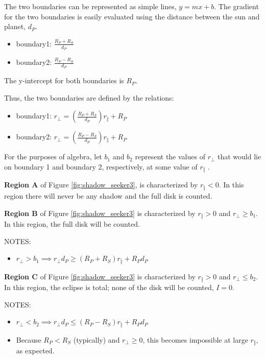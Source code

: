    The two boundaries can be represented as simple lines, $y=mx+b$.
   The gradient for the two boundaries is easily evaluated using the
   distance between the sun and planet, $d_P$.
   \begin{itemize}
    \item boundary1: $\frac{R_P+R_S} {d_P}$
    \item boundary2: $\frac{R_P-R_S} {d_P}$
   \end{itemize}
   The y-intercept for both boundaries is $R_P$.

   Thus, the two boundaries are defined by the relations:
   \begin{itemize}
    \item boundary1: $r_\bot=\left(\frac{R_{P}+R_{S}}{d_{P}}\right)r_\Vert+R_{P}$
    \item boundary2: $r_\bot=\left(\frac{R_{P}-R_{S}}{d_{P}}\right)r_\Vert+R_{P}$
   \end{itemize}


   For the purposes of algebra, let  $b_{1}$  and
    $b_{2}$ represent the values of
   $r_\bot$ that would lie on boundary 1 and boundary
   2, respectively, at some value of  $r_\Vert$ .

   \textbf{Region A} of Figure \ref{fig:shadow_seeker3}, is characterized by
   $r_\Vert<0$.  In this region there will never be any shadow and the full
   disk is counted.


   \textbf{Region B} of Figure \ref{fig:shadow_seeker3} is characterized by
    $r_\Vert>0$ and $r_\bot \geqslant b_{1}$.  In this region, the full disk
    will be counted.

    NOTES:
    \begin{itemize}
     \item $r_\bot>b_{1} \implies r_\bot d_P \geqslant (R_P + R_S)
            r_\Vert + R_P d_P $
    \end{itemize}



   \textbf{Region C} of Figure \ref{fig:shadow_seeker3} is characterized by
   $r_\Vert>0$ and $r_\bot \leqslant b_{2}$.  In this region, the eclipse is
   total; none of the disk will be counted,  $I=0$.

   NOTES:
   \begin{itemize}
    \item $r_\bot<b_{2} \implies r_\bot d_P \leqslant (R_P - R_S) r_\Vert
          + R_P d_P$
    \item Because $R_P < R_S$ (typically) and $r_\bot \geqslant 0$, this becomes
          impossible at large $r_\Vert$, as expected.
   \end{itemize}



